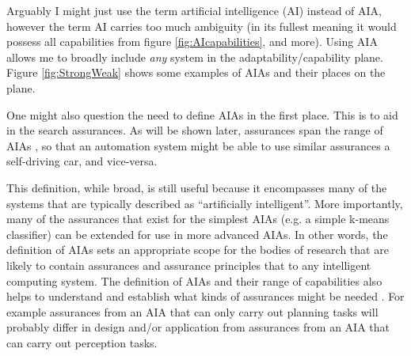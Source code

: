     Arguably I might just use the term artificial intelligence (AI) instead of AIA, however the term AI carries too much ambiguity (in its fullest meaning it would possess all capabilities from figure \ref{fig:AIcapabilities}, and more). Using AIA allows me to broadly include \emph{any} system in the adaptability/capability plane. Figure \ref{fig:StrongWeak} shows some examples of AIAs and their places on the plane.

    One might also question the need to define AIAs in the first place. This is to aid in the search  assurances. As will be shown later, assurances span the range of AIAs , so that an automation system  might be able to use similar assurances  a self-driving car, and vice-versa.

    This definition, while broad, is still useful because it encompasses many of the systems that are typically described %
    as ``artificially intelligent''. More importantly, many of the assurances that exist for the simplest AIAs (e.g. a simple k-means classifier) can be extended for use in more advanced AIAs. In other words, the definition of AIAs sets an appropriate scope for the bodies of research that are likely to contain assurances and assurance principles that  to any intelligent computing system. The definition of AIAs and their range of capabilities also helps to understand and establish what kinds of assurances might be needed . For example assurances from an AIA that can only carry out planning tasks will probably differ in design and/or application from assurances from an AIA that can  carry out perception tasks. 
